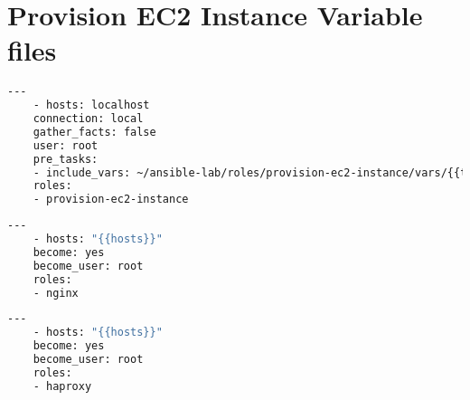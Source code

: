 \section{Provision EC2 Instance Variable files} \label{playbooks}

\begin{minipage}{\textwidth}
  \begin{lstlisting}[caption={provision-ec2.yml},label=ec2-playbook,language=bash]
    ---
    - hosts: localhost
    connection: local
    gather_facts: false
    user: root
    pre_tasks:
    - include_vars: ~/ansible-lab/roles/provision-ec2-instance/vars/{{type}}.yml
    roles:
    - provision-ec2-instance
  \end{lstlisting}
\end{minipage}

\noindent
\begin{minipage}{\textwidth}
  \begin{lstlisting}[caption={nginx.yml},label=nginx-playbook,language=bash]
    ---
    - hosts: "{{hosts}}"
    become: yes
    become_user: root
    roles:
    - nginx
  \end{lstlisting}
\end{minipage}

\noindent
\begin{minipage}{\textwidth}
  \begin{lstlisting}[caption={haproxy.yml},label=haproxy-playbook,language=bash]
    ---
    - hosts: "{{hosts}}"
    become: yes
    become_user: root
    roles:
    - haproxy
  \end{lstlisting}
\end{minipage}